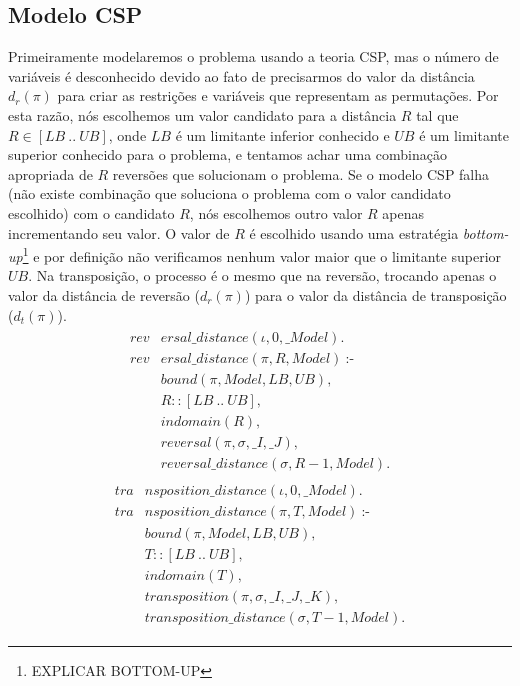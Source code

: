 \subsection{Modelo CSP}
\label{subsec:modelcsp}
Primeiramente modelaremos o problema usando a teoria CSP, mas o número
de variáveis é desconhecido devido ao fato de precisarmos do valor da
distância $d_{r}(\pi)$ para criar as restrições e variáveis que
representam as permutações. Por esta razão, nós escolhemos um valor
candidato para a distância $R$ tal que $R \in [LB~..~UB]$, onde $LB$ é
um limitante inferior conhecido e $UB$ é um limitante superior
conhecido para o problema, e tentamos achar uma combinação apropriada
de $R$ reversões que solucionam o problema. Se o modelo CSP falha (não
existe combinação que soluciona o problema com o valor candidato
escolhido) com o candidato $R$, nós escolhemos outro valor $R$ apenas
incrementando seu valor. O valor de $R$ é escolhido usando uma
estratégia \textit{bottom-up}\footnote{EXPLICAR BOTTOM-UP} e por
definição não verificamos nenhum valor maior que o limitante superior
$UB$. Na transposição, o processo é o mesmo que na reversão, trocando
apenas o valor da distância de reversão ($d_{r}(\pi)$) para o valor da
distância de transposição ($d_{t}(\pi)$).
\begin{align}
  \label{revdistance}
  \begin{split}
  \textit{rev}&\textit{ersal\_distance}(\iota, 0, \_Model). \\
  \textit{rev}&\textit{ersal\_distance}(\pi, R, Model)~\text{:-} \\
  &\textit{bound}(\pi, Model, LB, UB), \\
  &R :: [LB~..~UB], \\
  &\textit{indomain}(R),  \\
  &\textit{reversal}(\pi, \sigma, \_I, \_J),  \\
  &\textit{reversal\_distance}(\sigma, R-1, Model). 
  \end{split}
\end{align}
\begin{align}
  \label{tradistance}
  \begin{split}
  \textit{tra}&\textit{nsposition\_distance}(\iota, 0, \_Model). \\
  \textit{tra}&\textit{nsposition\_distance}(\pi, T, Model)~\text{:-} \\
  &\textit{bound}(\pi, Model, LB, UB), \\
  &T :: [LB~..~UB], \\
  &\textit{indomain}(T),  \\
  &\textit{transposition}(\pi, \sigma, \_I, \_J, \_K),  \\
  &\textit{transposition\_distance}(\sigma, T-1, Model). 
  \end{split}
\end{align}

